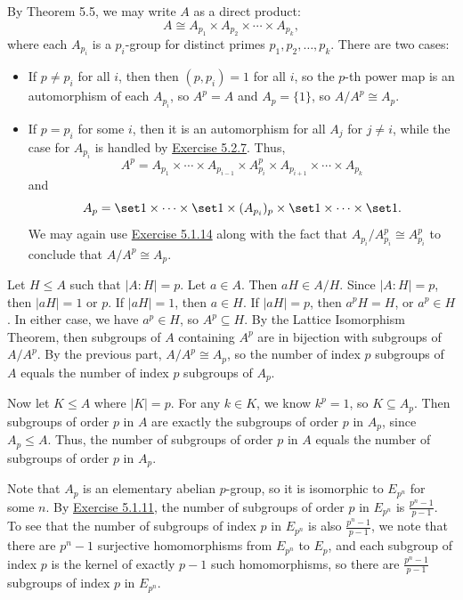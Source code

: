 \begin{solalph}
    \item By Theorem 5.5, we may write $A$ as a direct product:
    \[A \cong A_{p_1} \times A_{p_2} \times \cdots \times A_{p_k},\]
    where each $A_{p_i}$ is a $p_i$-group for distinct primes $p_1, p_2, \ldots, p_k$. There are two cases:
    \begin{itemize}
        \item If $p \neq p_i$ for all $i$, then then $(p, p_i) = 1$ for all $i$, so the $p$-th power map is an automorphism of each $A_{p_i}$, so $A^p = A$ and $A_p = \{1\}$, so $A/A^p \cong A_p$.
        \item If $p = p_i$ for some $i$, then it is an automorphism for all $A_j$ for $j \neq i$, while the case for $A_{p_i}$ is handled by \hyperref[ex5.2.7]{Exercise 5.2.7}. Thus,
        \[A^p = A_{p_1} \times \cdots \times A_{p_{i-1}} \times A_{p_i}^p \times A_{p_{i+1}} \times \cdots \times A_{p_k}\]
        and
        \[A_p = \set 1 \times \cdots \times \set 1 \times (A_{p_i})_p \times \set 1 \times \cdots \times \set 1.\]
        We may again use \hyperref[ex5.1.14]{Exercise 5.1.14} along with the fact that $A_{p_i} / A_{p_i}^p \cong A_{p_i}^p$ to conclude that $A/A^p \cong A_p$.
    \end{itemize}
    \item Let $H \leq A$ such that $|A : H| = p$. Let $a \in A$. Then $aH \in A/H$. Since $|A : H| = p$, then $|aH| = 1$ or $p$. If $|aH| = 1$, then $a \in H$. If $|aH| = p$, then $a^pH = H$, or $a^p \in H$. In either case, we have $a^p \in H$, so $A^p \subseteq H$. By the Lattice Isomorphism Theorem, then subgroups of $A$ containing $A^p$ are in bijection with subgroups of $A/A^p$. By the previous part, $A/A^p \cong A_p$, so the number of index $p$ subgroups of $A$ equals the number of index $p$ subgroups of $A_p$.
    
    Now let $K \leq A$ where $|K| = p$. For any $k \in K$, we know $k^p = 1$, so $K \subseteq A_p$. Then subgroups of order $p$ in $A$ are exactly the subgroups of order $p$ in $A_p$, since $A_p \leq A$. Thus, the number of subgroups of order $p$ in $A$ equals the number of subgroups of order $p$ in $A_p$.

    Note that $A_p$ is an elementary abelian $p$-group, so it is isomorphic to $E_{p^n}$ for some $n$. By \hyperref[ex5.1.11]{Exercise 5.1.11}, the number of subgroups of order $p$ in $E_{p^n}$ is $\frac{p^n - 1}{p - 1}$. To see that the number of subgroups of index $p$ in $E_{p^n}$ is also $\frac{p^n - 1}{p - 1}$, we note that there are $p^n - 1$ surjective homomorphisms from $E_{p^n}$ to $E_p$, and each subgroup of index $p$ is the kernel of exactly $p - 1$ such homomorphisms, so there are $\frac{p^n - 1}{p - 1}$ subgroups of index $p$ in $E_{p^n}$.
\end{solalph}

